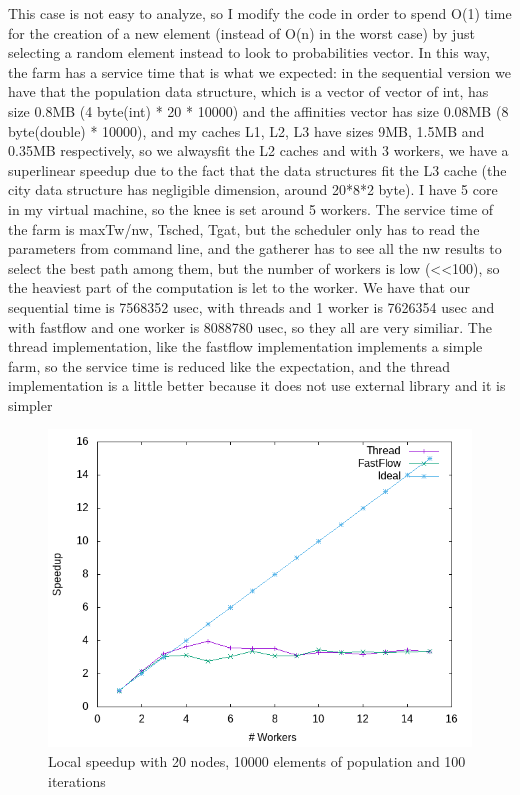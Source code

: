 \documentclass{article}
\begin{document}
	This case is not easy to analyze, so I modify the code in order to spend O(1) time for the creation of a new element (instead of O(n) in the worst case) by just selecting a random element instead to look to probabilities vector. In this way, the farm has a service time that is what we expected: in the sequential version we have that the population data structure, which is a vector of vector of int, has size 0.8MB (4 byte(int) * 20 * 10000) and the affinities vector has size 0.08MB (8 byte(double) * 10000), and my caches L1, L2, L3 have sizes 9MB, 1.5MB and 0.35MB respectively, so we alwaysfit the L2 caches and with 3 workers, we have a superlinear speedup due to the fact that the data structures fit the L3 cache (the city data structure has negligible dimension, around 20*8*2 byte). I have 5 core in my virtual machine, so the knee is set around 5 workers. The service time of the farm is max{Tw/nw, Tsched, Tgat}, but the scheduler only has to read the parameters from command line, and the gatherer has to see all the nw results to select the best path among them, but the number of workers is low (<<100), so the heaviest part of the computation is let to the worker. We have that our sequential time is 7568352 usec, with threads and 1 worker is 7626354 usec and with fastflow and one worker is 8088780 usec, so they all are very similiar. The thread implementation, like the fastflow implementation implements a simple farm, so the service time is reduced like the expectation, and the thread implementation is a little better because it does not use external library and it is simpler
    \begin{figure}
        \includegraphics[width=\linewidth]{img/local_20_10000_100_rand.png}
        \caption{Local speedup with 20 nodes, 10000 elements of population and 100 iterations}
        \label{fig:local_speedup}
    \end{figure}
\end{document}
